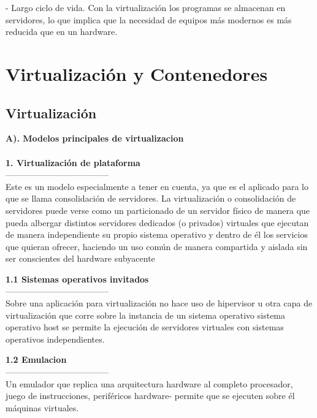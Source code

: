 \documentclass[twoside,twocolumn]{article}
\begin{document}
\begin{flushright}
\begin{itemize}
- Largo ciclo de vida. Con la virtualización los programas se almacenan en servidores, lo que implica que la necesidad de equipos más modernos es más reducida que en un hardware.











\section{Virtualización y Contenedores}

\subsection{Virtualización}


 \textbf{A). Modelos principales de virtualizacion }\\

\textbf{}\\
 \textbf{1.  Virtualización de plataforma }\\
------------------------------------
\textbf{}\\
 Este es un modelo especialmente a tener en cuenta, ya que es el aplicado para lo que se llama consolidación de servidores. La virtualización o consolidación de servidores puede verse como un particionado de un servidor físico de manera que pueda albergar distintos servidores dedicados (o privados) virtuales que ejecutan de manera independiente su propio sistema operativo y dentro de él los servicios que quieran ofrecer, haciendo un uso común de manera compartida y aislada sin ser conscientes del hardware subyacente

 \textbf{1.1  Sistemas operativos invitados }\\
------------------------------------
\textbf{}\\
Sobre una aplicación para virtualización no
hace uso de hipervisor u otra capa de virtualización que corre sobre la instancia
de un sistema operativo sistema operativo host se permite la ejecución de
servidores virtuales con sistemas operativos independientes.

 \textbf{1.2  Emulacion }\\
------------------------------------
\textbf{}\\
Un emulador que replica una arquitectura hardware al completo
procesador, juego de instrucciones, periféricos hardware- permite que se
ejecuten sobre él máquinas virtuales.


\end{itemize}
\end{flushright}
\end{document}
